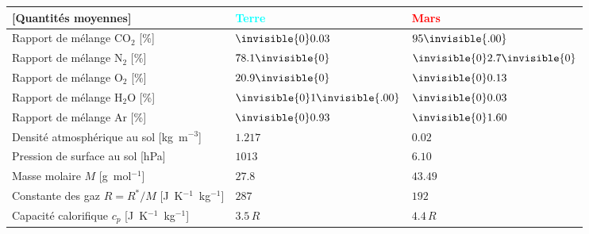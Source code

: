 \begin{table}
\begin{tabular}{lll}
\scriptsize{[Quantités moyennes]}					& \textcolor{cyan}{Terre}	& \textcolor{red}{Mars}\\
\hline
Rapport de mélange CO$_2$ 	\footnotesize{[\%]}			& $\invisible{0}0.03$			& $95\invisible{.00}$\\
Rapport de mélange N$_2$	\footnotesize{[\%]}			& $78.1\invisible{0}$			& $\invisible{0}2.7\invisible{0}$\\
Rapport de mélange O$_2$	\footnotesize{[\%]}			& $20.9\invisible{0}$			& $\invisible{0}0.13$\\
Rapport de mélange H$_2$O	\footnotesize{[\%]}			& $\invisible{0}1\invisible{.00}$	& $\invisible{0}0.03$\\
Rapport de mélange Ar		\footnotesize{[\%]}			& $\invisible{0}0.93$			& $\invisible{0}1.60$\\	
\hline
Densité atmosphérique au sol 		\footnotesize{[kg~m$^{-3}$]}			& $1.217$		& $0.02$\\  %
Pression de surface au sol		\footnotesize{[hPa]}				& $1013$		& $6.10$\\
Masse molaire $M$	 		\footnotesize{[g~mol$^{-1}$]}			& $27.8$		& $43.49$\\
Constante des gaz $R=R^*/M$  		\footnotesize{[J~K$^{-1}$~kg$^{-1}$]}		& $287$			& $192$\\
Capacité calorifique $c_p$		\footnotesize{[J~K$^{-1}$~kg$^{-1}$]}		& $3.5 \, R$		& $4.4 \, R$\\
\hline
\end{tabular}
\end{table}
